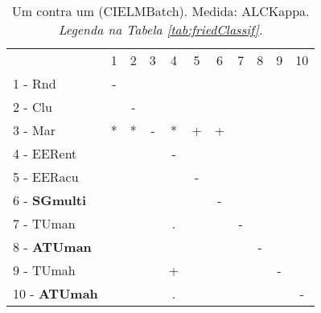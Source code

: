 \begin{table}[h]
\caption{Um contra um (CIELMBatch). Medida: ALCKappa. \textit{Legenda na Tabela \ref{tab:friedClassif}.}}
\begin{center}\begin{tabular}{lcc|cc|cc|cc|cc}
 			& 1 & 2 & 3 & 4 & 5 & 6 & 7 & 8 & 9 & 10\\
1 - Rnd  	& - &   &   &   &   &   &   &   &   &   \\
2 - Clu  	&   & - &   &   &   &   &   &   &   &   \\ \hline
3 - Mar  	& * & * & - & * & + & + &   &   &   &   \\
4 - EERent	&   &   &   & - &   &   &   &   &   &   \\ \hline
5 - EERacu	&   &   &   &   & - &   &   &   &   &   \\
6 - \textbf{SGmulti}	&   &   &   &   &   & - &   &   &   &   \\ \hline
7 - TUman	&   &   &   & . &   &   & - &   &   &   \\
8 - \textbf{ATUman}	&   &   &   &   &   &   &   & - &   &   \\ \hline
9 - TUmah	&   &   &   & + &   &   &   &   & - &   \\
10 - \textbf{ATUmah}	&   &   &   & . &   &   &   &   &   & - \\ \hline\end{tabular}
\label{stratsALCKappaFriedCIELMBatchRedux}
\end{center}
\end{table}